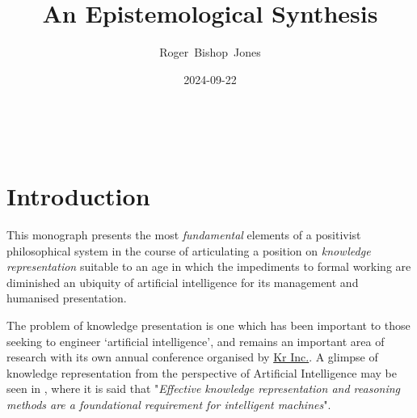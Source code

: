 \documentclass[10pt,titlepage]{book}
\title{\bf\LARGE An Epistemological Synthesis}
\author{Roger~Bishop~Jones}
\date{\small 2024-09-22}
\newcommand{\ignore}[1]{}
\begin{document}

%
                               
\begin{titlepage}
\maketitle





\end{titlepage}

\ \

\ignore{
\begin{centering}
{}
\end{centering}
}%

\setcounter{tocdepth}{2}
{\parskip-0pt\tableofcontents}




\chapter{Introduction}

This monograph presents the most \emph{fundamental} elements of a positivist philosophical system in the course of articulating a position on \emph{knowledge representation} suitable to an age in which the impediments to formal working are diminished an ubiquity of artificial intelligence for its management and humanised presentation.

The problem of knowledge presentation is one which has been important to those seeking to engineer `artificial intelligence', and remains an important area of research with its own annual conference organised by \href{https://kr.org}{Kr Inc.}.
A glimpse of knowledge representation from the perspective of Artificial Intelligence may be seen in \emph{}\cite{fikes20}, where it is said that "\emph{Effective knowledge representation and reasoning methods are a foundational requirement for intelligent machines}".
\end{document}
